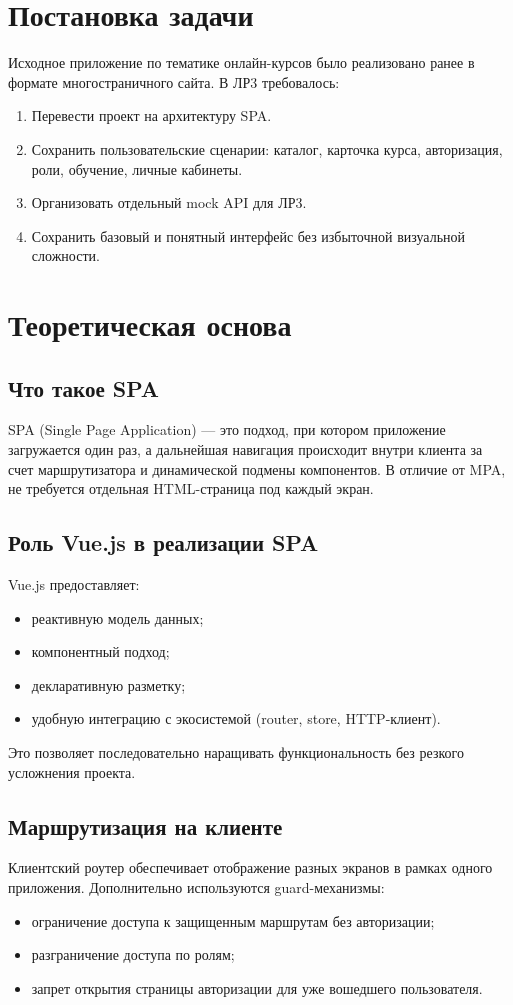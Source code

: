 \documentclass[a4paper,12pt]{article}
\begin{document}
\section{Постановка задачи}
Исходное приложение по тематике онлайн-курсов было реализовано ранее в формате многостраничного сайта. В ЛР3 требовалось:
\begin{enumerate}
    \item Перевести проект на архитектуру SPA.
    \item Сохранить пользовательские сценарии: каталог, карточка курса, авторизация, роли, обучение, личные кабинеты.
    \item Организовать отдельный mock API для ЛР3.
    \item Сохранить базовый и понятный интерфейс без избыточной визуальной сложности.
\end{enumerate}

\section{Теоретическая основа}
\subsection{Что такое SPA}
SPA (Single Page Application) --- это подход, при котором приложение загружается один раз, а дальнейшая навигация происходит внутри клиента за счет маршрутизатора и динамической подмены компонентов. В отличие от MPA, не требуется отдельная HTML-страница под каждый экран.

\subsection{Роль Vue.js в реализации SPA}
Vue.js предоставляет:
\begin{itemize}
    \item реактивную модель данных;
    \item компонентный подход;
    \item декларативную разметку;
    \item удобную интеграцию с экосистемой (router, store, HTTP-клиент).
\end{itemize}
Это позволяет последовательно наращивать функциональность без резкого усложнения проекта.

\subsection{Маршрутизация на клиенте}
Клиентский роутер обеспечивает отображение разных экранов в рамках одного приложения. Дополнительно используются guard-механизмы:
\begin{itemize}
    \item ограничение доступа к защищенным маршрутам без авторизации;
    \item разграничение доступа по ролям;
    \item запрет открытия страницы авторизации для уже вошедшего пользователя.
\end{itemize}
\end{document}
